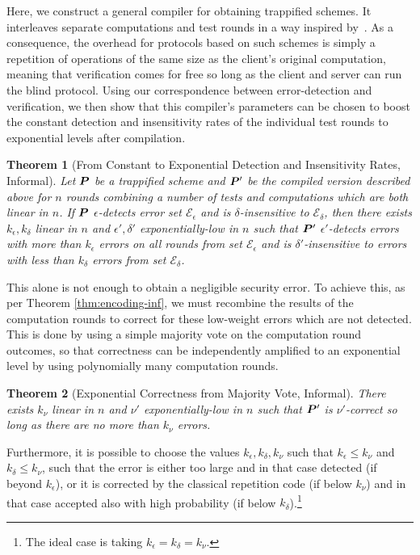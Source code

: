 \documentclass[12pt]{iopart}
\renewcommand{\1}{\mathds{1}}
\newtheorem{theorem}{Theorem}
\begin{document}
Here, we construct a general compiler for obtaining trappified schemes.
It interleaves separate computations and test rounds in a way inspired by~\cite{LMKO21:verifying}.
As a consequence, the overhead for protocols based on such schemes is simply a repetition of operations of the same size as the client's original computation, meaning that verification comes for free so long as the client and server can run the blind protocol.
Using our correspondence between error-detection and verification, we then show that this compiler's parameters can be chosen to boost the constant detection and insensitivity rates of the individual test rounds to exponential levels after compilation.
\begin{theorem}[From Constant to Exponential Detection and Insensitivity Rates, Informal]
	Let $\bm{P}$ be a trappified scheme and $\bm{P}'$ be the compiled version described above for $n$ rounds combining a number of tests and computations which are both linear in $n$.
	If $\bm{P}$ $\epsilon$-detects error set $\mathcal{E}_\epsilon$ and is $\delta$-insensitive to $\mathcal{E}_\delta$, then there exists $k_\epsilon, k_\delta$ linear in $n$ and $\epsilon', \delta'$ exponentially-low in $n$ such that $\bm{P}'$ $\epsilon'$-detects errors with more than $k_\epsilon$ errors on all rounds from set $\mathcal{E}_\epsilon$ and is $\delta'$-insensitive to errors with less than $k_\delta$ errors from set $\mathcal{E}_\delta$.
\end{theorem}

This alone is not enough to obtain a negligible security error. To achieve this, as per Theorem \ref{thm:encoding-inf}, we must recombine the results of the computation rounds to correct for these low-weight errors which are not detected.
This is done by using a simple majority vote on the computation round outcomes, so that correctness can be independently amplified to an exponential level by using polynomially many computation rounds.
\begin{theorem}[Exponential Correctness from Majority Vote, Informal]
There exists $k_\nu$ linear in $n$ and $\nu'$ exponentially-low in $n$ such that $\bm{P}'$ is $\nu'$-correct so long as there are no more than $k_\nu$ errors.
\end{theorem}

Furthermore, it is possible to choose the values $k_\epsilon, k_\delta, k_\nu$ such that $k_\epsilon \leq k_\nu$ and $k_\delta \leq k_\nu$, such that the error is either too large and in that case detected (if beyond $k_\epsilon$), or it is corrected by the classical repetition code (if below $k_\nu$) and in that case accepted also with high probability (if below $k_\delta$).\footnote{The ideal case is taking $k_\epsilon = k_\delta = k_\nu$.}
\end{document}
